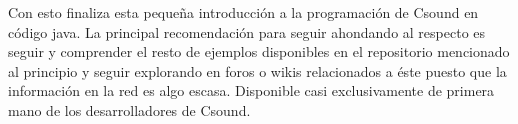 
Con esto finaliza esta pequeña introducción a la programación de Csound en código java. La principal recomendación para seguir ahondando al respecto es seguir y comprender el resto de ejemplos disponibles en el repositorio mencionado al principio y seguir explorando en foros o wikis relacionados a éste puesto que la información en la red es algo escasa. Disponible casi exclusivamente de primera mano de los desarrolladores de Csound.




